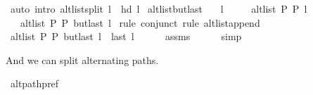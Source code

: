 \begin{isabellebody}
\ {\isacharparenleft}{\kern0pt}auto\ intro{\isacharcolon}{\kern0pt}\ alt{\isacharunderscore}{\kern0pt}list{\isacharunderscore}{\kern0pt}split{\isacharunderscore}{\kern0pt}{}{\isacharbrackleft}{\kern0pt}\ {\isacharquery}{\kern0pt}l{}{\isachardot}{\kern0pt}{}\ {\isacharequal}{\kern0pt}\ {\isachardoublequoteopen}{\isacharbrackleft}{\kern0pt}hd\ l{\isacharbrackright}{\kern0pt}{\isachardoublequoteclose}{\isacharbrackright}{\kern0pt}{\isacharparenright}{\kern0pt}%
\endisatagproof
{\isafoldproof}%
%
\isadelimproof
\isanewline
%
\endisadelimproof
%
\isadeliminvisible
\isanewline
%
\endisadeliminvisible
%
\isataginvisible
{}\isamarkupfalse%
\ alt{\isacharunderscore}{\kern0pt}list{\isacharunderscore}{\kern0pt}butlast{\isacharcolon}{\kern0pt}\isanewline
\ \ \ {\isachardoublequoteopen}l\ {\isasymnoteq}\ {\isacharbrackleft}{\kern0pt}{\isacharbrackright}{\kern0pt}{\isachardoublequoteclose}\isanewline
\ \ \ {\isachardoublequoteopen}alt{\isacharunderscore}{\kern0pt}list\ P{}\ P{}\ l{\isachardoublequoteclose}\isanewline
\ \ \ {\isachardoublequoteopen}alt{\isacharunderscore}{\kern0pt}list\ P{}\ P{}\ {\isacharparenleft}{\kern0pt}butlast\ l{\isacharparenright}{\kern0pt}{\isachardoublequoteclose}%
\endisataginvisible
{\isafoldinvisible}%
%
\isadeliminvisible
\isanewline
%
\endisadeliminvisible
%
\isadelimproof
%
\endisadelimproof
%
\isatagproof
{}\isamarkupfalse%
\ {\isacharparenleft}{\kern0pt}rule\ conjunct{}{\isacharcomma}{\kern0pt}\ rule\ alt{\isacharunderscore}{\kern0pt}list{\isacharunderscore}{\kern0pt}append{\isacharunderscore}{\kern0pt}{}{\isacharparenright}{\kern0pt}\isanewline
\ \ \isamarkupfalse%
\ {\isachardoublequoteopen}alt{\isacharunderscore}{\kern0pt}list\ P{}\ P{}\ {\isacharparenleft}{\kern0pt}butlast\ l\ {\isacharat}{\kern0pt}\ {\isacharbrackleft}{\kern0pt}last\ l{\isacharbrackright}{\kern0pt}{\isacharparenright}{\kern0pt}{\isachardoublequoteclose}\isanewline
\ \ \ \ \isamarkupfalse%
\ assms\isanewline
\ \ \ \ \isamarkupfalse%
\ simp\isanewline
{}\isamarkupfalse%
%
\endisatagproof
{\isafoldproof}%
%
\isadelimproof
%
\endisadelimproof
%
\begin{isamarkuptext}%
And we can split alternating paths.%
\end{isamarkuptext}\isamarkuptrue%
\isamarkupfalse%
\ alt{\isacharunderscore}{\kern0pt}path{\isacharunderscore}{\kern0pt}pref{\isacharcolon}{\kern0pt}\isanewline

\end{isabellebody}
